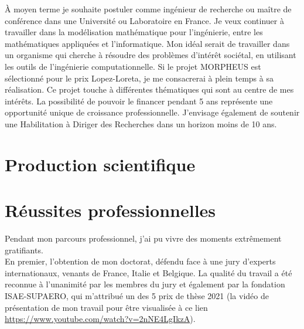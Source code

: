 \documentclass[12pt, french]{article}
\begin{document}
\`A moyen terme je souhaite postuler comme ingénieur de recherche ou maître de conférence dans une Université ou Laboratoire en France. Je veux continuer à travailler dans la modélisation mathématique pour l'ingénierie, entre les mathématiques appliquées et l'informatique. Mon idéal serait de travailler dans un organisme qui cherche à résoudre des problèmes d'intérêt sociétal, en utilisant les outils de l'ingénierie computationnelle.  Si le projet MORPHEUS est sélectionné pour le prix Lopez-Loreta, je me consacrerai à plein temps à sa réalisation. Ce projet touche à différentes thématiques qui sont au centre de mes intérêts. La possibilité de pouvoir le financer pendant 5 ans représente une opportunité unique de croissance professionnelle. J'envisage également de soutenir une Habilitation à Diriger des Recherches dans un horizon moins de 10 ans.


\section{Production scientifique}
{

 
}


\section{Réussites professionnelles}

Pendant mon parcours professionnel, j'ai pu vivre des moments extrêmement gratifiants. \\

En premier, l'obtention de mon doctorat, défendu face à une jury d'experts internationaux, venants de France, Italie et Belgique. La qualité du travail a été reconnue à l'unanimité par les membres du jury et également par la fondation ISAE-SUPAERO, qui m'attribué un des 5 prix de thèse 2021 (la vidéo de présentation de mon travail pour être visualisée à ce lien \url{https://www.youtube.com/watch?v=2nNE4LgIkzA}). \\
 
\end{document}
